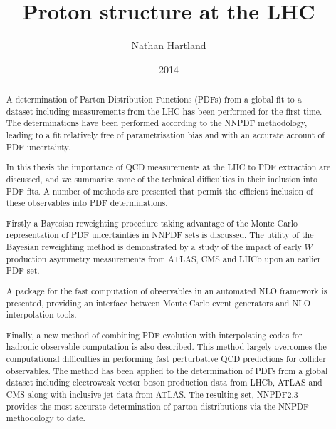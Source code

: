 \documentclass[12pt,twoside,openright]{report}
\title{Proton structure at the LHC}
\author{Nathan Hartland}
\date{2014}
\begin{document}
\maketitle
\setcounter{page}{1}
\dedication{To my parents}

\declaration

\acknowledgements

\begin{spacing}{1.5}

\begin{abstract}
A determination of Parton Distribution Functions (PDFs) from a global fit to a dataset including measurements from the LHC has been performed for the first time. The determinations
have been performed according to the NNPDF methodology, leading to a fit relatively free of parametrisation bias and with an accurate account of PDF uncertainty.

In this thesis the importance of QCD measurements at the LHC to PDF extraction are discussed, and we summarise some of the technical difficulties in their inclusion into PDF fits. A number of methods are presented that permit the efficient inclusion of these observables
into PDF determinations. 

Firstly a Bayesian reweighting procedure taking advantage of the Monte Carlo representation of PDF uncertainties in NNPDF sets is discussed. The utility of the Bayesian reweighting method is demonstrated by a study of the impact of early $W$ production asymmetry measurements from ATLAS, CMS and LHCb upon an earlier PDF set.

A package for the fast computation of observables in an automated NLO framework is presented, providing an interface between Monte Carlo event generators and NLO interpolation tools.

Finally, a new method of combining PDF evolution with interpolating codes for hadronic observable computation is also described. This method largely overcomes the computational difficulties in performing fast perturbative QCD predictions for collider observables. The method has been applied to the determination of PDFs from a global dataset including electroweak vector boson production data from LHCb, ATLAS and CMS along with inclusive jet data from ATLAS. The resulting set, NNPDF2.3 provides the most accurate determination of parton distributions via the NNPDF methodology to date.


\end{abstract}
\end{spacing}
\end{document}
